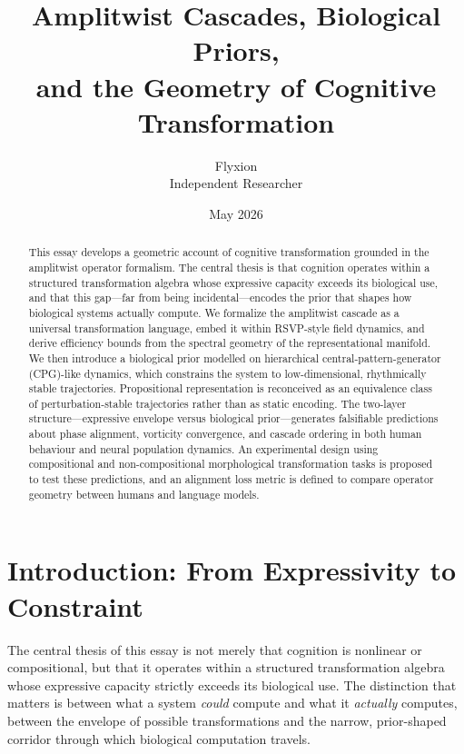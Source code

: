 \documentclass[12pt, a4paper]{article}
\title{\textbf{Amplitwist Cascades, Biological Priors,\\[0.3ex]
and the Geometry of Cognitive Transformation}}
\author{Flyxion\\[0.5ex]
\small Independent Researcher}
\date{May 2026}
\theoremstyle{remark}
\theoremstyle{definition}
\begin{document}
\maketitle

\begin{abstract}
\noindent
This essay develops a geometric account of cognitive transformation grounded in the
amplitwist operator formalism.  The central thesis is that cognition operates within a
structured transformation algebra whose expressive capacity exceeds its biological use,
and that this gap---far from being incidental---encodes the prior that shapes how biological
systems actually compute.  We formalize the amplitwist cascade as a universal transformation
language, embed it within RSVP-style field dynamics, and derive efficiency bounds from the
spectral geometry of the representational manifold.  We then introduce a biological prior
modelled on hierarchical central-pattern-generator (CPG)-like dynamics, which constrains
the system to low-dimensional, rhythmically stable trajectories.  Propositional
representation is reconceived as an equivalence class of perturbation-stable trajectories
rather than as static encoding.  The two-layer structure---expressive envelope versus
biological prior---generates falsifiable predictions about phase alignment, vorticity
convergence, and cascade ordering in both human behaviour and neural population dynamics.
An experimental design using compositional and non-compositional morphological
transformation tasks is proposed to test these predictions, and an alignment loss metric is
defined to compare operator geometry between humans and language models.
\end{abstract}

\newpage

\tableofcontents
\bigskip

\section{Introduction: From Expressivity to Constraint}
\label{sec:intro}

The central thesis of this essay is not merely that cognition is nonlinear or
compositional, but that it operates within a structured transformation algebra whose
expressive capacity strictly exceeds its biological use.  The distinction that matters is
between what a system \emph{could} compute and what it \emph{actually} computes, between
the envelope of possible transformations and the narrow, prior-shaped corridor through which
biological computation travels.
\end{document}
